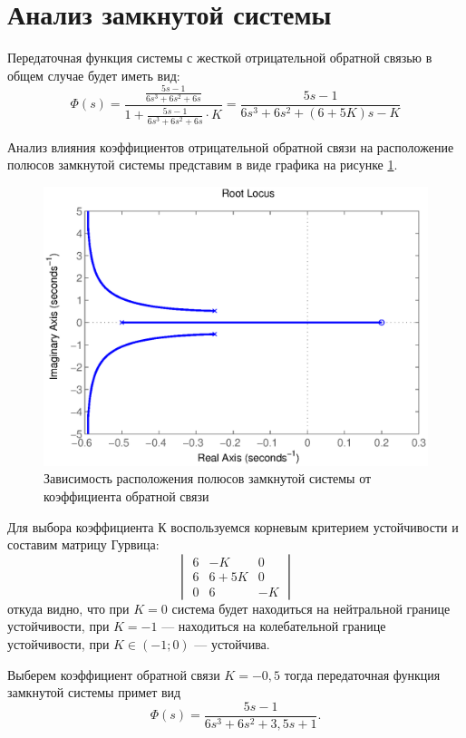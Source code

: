 \documentclass[a4paper,12pt]{article} %
\begin{document}
\section{Анализ замкнутой системы}
Передаточная функция системы с жесткой отрицательной обратной связью в общем случае будет иметь вид:
\begin{equation}
\Phi(s) = \frac{\displaystyle{\frac{5s - 1}{6s^3 + 6s^2 + 6s}}}{1 + \displaystyle{\frac{5s - 1}{6s^3 + 6s^2 + 6s}}\cdot K} = \frac{5s - 1}{6s^3 + 6s^2 + (6 + 5K)s - K}
\end{equation}\par
Анализ влияния коэффициентов отрицательной обратной связи на расположение полюсов замкнутой системы представим в виде графика на рисунке \ref{rlocus}.
\begin{figure}[H]
	\centering
	\includegraphics[width = 1\textwidth]{scheme/rlocus}
	\caption{Зависимость расположения полюсов замкнутой системы от коэффициента обратной связи}
	\label{rlocus}
\end{figure}
Для выбора коэффициента К воспользуемся корневым критерием устойчивости и составим матрицу Гурвица:
\[
\begin{vmatrix}
6 & -K & 0\\
6 & 6+5K & 0\\
0 & 6 & -K
\end{vmatrix}
\]
откуда видно, что при $K = 0$ система будет находиться на нейтральной границе устойчивости, при $K = -1$ --- находиться на колебательной границе устойчивости, при $K \in (-1;0)$ --- устойчива.
	
Выберем коэффициент обратной связи $K = -0,5$ тогда передаточная функция замкнутой системы примет вид
\begin{equation}
\Phi(s) = \frac{5s - 1}{6s^3 + 6s^2 + 3,5s + 1}.
\end{equation}
\end{document}
